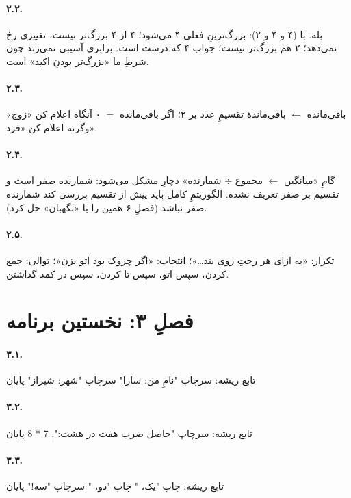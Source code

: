\paragraph{۲.۲.} بله. با (۴ و ۴ و ۲): بزرگ‌ترینِ فعلی ۴ می‌شود؛ ۴ از ۴
بزرگ‌تر نیست، تغییری رخ نمی‌دهد؛ ۲ هم بزرگ‌تر نیست؛ جواب ۴ که درست است.
برابری آسیبی نمی‌زند چون شرطِ ما «بزرگ‌تر بودنِ اکید» است.

\paragraph{۲.۳.} باقی‌مانده $\leftarrow$ باقی‌ماندهٔ تقسیمِ عدد بر ۲؛
اگر باقی‌مانده $=$ ۰ آنگاه اعلام کن «زوج» وگرنه اعلام کن «فرد».

\paragraph{۲.۴.} گامِ «میانگین $\leftarrow$ مجموع $\div$ شمارنده» دچارِ
مشکل می‌شود: شمارنده صفر است و تقسیم بر صفر تعریف نشده. الگوریتمِ کامل
باید پیش از تقسیم بررسی کند شمارنده صفر نباشد (فصلِ ۶ همین را با
«نگهبان» حل کرد).

\paragraph{۲.۵.} تکرار: «به ازای هر رختِ روی بند\ldots»؛ انتخاب: «اگر چروک
بود اتو بزن»؛ توالی: جمع کردن، سپس اتو، سپس تا کردن، سپس در کمد گذاشتن.

\section*{فصلِ ۳: نخستین برنامه}

\paragraph{۳.۱.}
\begin{salamfa}
تابع ریشه:
    سرچاپ "نامِ من: سارا"
    سرچاپ "شهر: شیراز"
پایان
\end{salamfa}

\paragraph{۳.۲.}
\begin{salamfa}
تابع ریشه:
    سرچاپ "حاصل ضرب هفت در هشت:", 7 * 8
پایان
\end{salamfa}

\paragraph{۳.۳.}
\begin{salamfa}
تابع ریشه:
    چاپ "یک، "
    چاپ "دو، "
    سرچاپ "سه!"
پایان
\end{salamfa}

